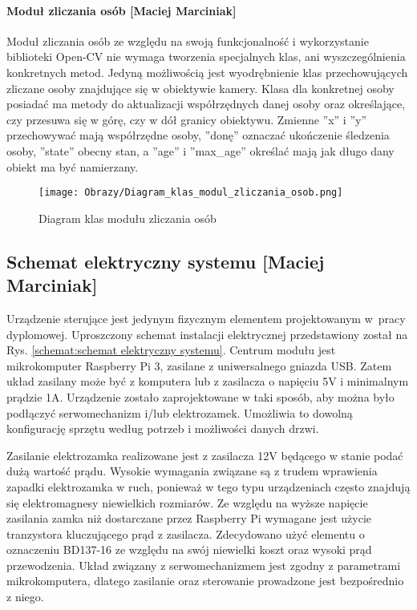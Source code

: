 	\paragraph*{Moduł zliczania osób [Maciej Marciniak]}
	Moduł zliczania osób ze względu na swoją funkcjonalność i wykorzystanie biblioteki Open-CV nie wymaga tworzenia specjalnych klas, ani wyszczególnienia konkretnych metod. Jedyną możliwością jest wyodrębnienie klas przechowujących zliczane osoby znajdujące się w obiektywie kamery. Klasa dla konkretnej osoby posiadać ma metody do aktualizacji współrzędnych danej osoby oraz określające, czy przesuwa się w górę, czy w dół granicy obiektywu. Zmienne ''x'' i ''y'' przechowywać mają współrzędne osoby, ''donę'' oznaczać ukończenie śledzenia osoby, ''state'' obecny stan, a ''age'' i ''max\_age'' określać mają jak długo dany obiekt ma być namierzany.
	\begin{figure}[!h]
		\centering
		\texttt{[image: Obrazy/Diagram\_klas\_modul\_zliczania\_osob.png]}
		\caption{Diagram klas modułu zliczania osób}
		\label{diagram:Diagram_klas_modul_zliczania_osob}
	\end{figure}
\newpage		
\subsection[Schemat elektryczny systemu]{Schemat elektryczny systemu [Maciej Marciniak]}\label{sec:Schemat elektryczny zamka}
Urządzenie sterujące jest jedynym fizycznym elementem projektowanym w~pracy dyplomowej. Uproszczony schemat instalacji elektrycznej przedstawiony został na Rys. \ref{schemat:schemat elektryczny systemu}. Centrum modułu jest mikrokomputer Raspberry Pi 3, zasilane z uniwersalnego gniazda USB. Zatem układ zasilany może być z komputera lub z zasilacza o napięciu 5V i minimalnym prądzie 1A. Urządzenie zostało zaprojektowane w taki sposób, aby można było podłączyć serwomechanizm i/lub elektrozamek. Umożliwia to dowolną konfigurację sprzętu według potrzeb i możliwości danych drzwi. 

Zasilanie elektrozamka realizowane jest z zasilacza 12V będącego w stanie podać dużą wartość prądu. Wysokie wymagania związane są z trudem wprawienia zapadki elektrozamka w ruch, ponieważ w tego typu urządzeniach często znajdują się elektromagnesy niewielkich rozmiarów. Ze względu na wyższe napięcie zasilania zamka niż dostarczane przez Raspberry Pi wymagane jest użycie tranzystora kluczującego prąd z zasilacza. Zdecydowano użyć elementu o oznaczeniu BD137-16 ze względu na swój niewielki koszt oraz wysoki prąd przewodzenia. Układ związany z serwomechanizmem jest zgodny z parametrami mikrokomputera, dlatego zasilanie oraz sterowanie prowadzone jest bezpośrednio z niego.

